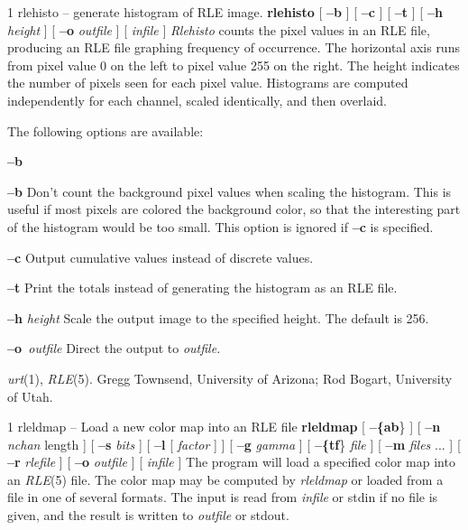 %
%
%
 1
rlehisto -- generate histogram of RLE image.
{\bf rlehisto}
[
{\bf --b}
] [
{\bf --c}
] [
{\bf --t}
] [
{\bf --h}
{\it height}
] [
{\bf --o}
{\it outfile}
] [ 
{\it infile}
]
{\it Rlehisto}
counts the pixel values in an RLE file,
producing an RLE file graphing frequency of occurrence.
The horizontal axis runs from pixel value 0 on the left
to pixel value 255 on the right.
The height indicates the number of pixels seen for each pixel value.
Histograms are computed independently for each channel,
scaled identically, and then overlaid.
\par\noindent
The following options are available:
\begin{TPlist}{{\bf --b}}
\item[{{\bf --b}}]
Don't count the background pixel values when scaling the histogram.
This is useful if most pixels are colored the background color, so
that the interesting part of the histogram would be too small.  This
option is ignored if
{\bf --c}
is specified.
\item[{{\bf --c}}]
Output cumulative values instead of discrete values.
\item[{{\bf --t}}]
Print the totals instead of generating the histogram as an RLE file.
\item[{{\bf --h} }]
{\it height}
Scale the output image to the specified height.
The default is 256.
\item[{{\bf --o}{\it \ outfile}
}]
Direct the output to
{\it outfile.}
\end{TPlist}
{\it urt}{\rm (1),}
{\it RLE}{\rm (5).}
Gregg Townsend, University of Arizona;
Rod Bogart, University of Utah.
\newpage


%
%
%
 1
rleldmap -- Load a new color map into an RLE file
{\bf rleldmap}
[
{\bf --\{ab}\}
] [
{\bf --n}
{\it nchan} length
] [
{\bf --s}
{\it bits}
] [
{\bf --l}
[
{\it factor}
] ] [
{\bf --g}
{\it gamma}
] [
{\bf --\{tf}\}
{\it file}
] [
{\bf --m}
{\it files} ...
] [
{\bf --r}
{\it rlefile}
] [
{\bf --o}
{\it outfile}
] [
{\it infile}
]
The program will load a specified color map into an
{\it RLE}{\rm (5)}
file.  The color map may be computed by 
{\it rleldmap}
or loaded from a file in one of several formats.  The input is read from
{\it infile}
or stdin if no file is given, and the result is written to
{\it outfile}
or stdout.  

